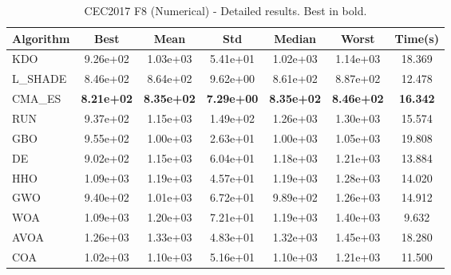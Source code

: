 \begin{table}[H]
\centering\small
\caption{CEC2017 F8 (Numerical) - Detailed results. Best in bold.}
\label{tab:cec2017_F8}
\begin{tabular}{lcccccc}
\toprule
\textbf{Algorithm} & \textbf{Best} & \textbf{Mean} & \textbf{Std} & \textbf{Median} & \textbf{Worst} & \textbf{Time(s)} \\
\midrule
KDO & 9.26e+02 & 1.03e+03 & 5.41e+01 & 1.02e+03 & 1.14e+03 & 18.369 \\
L_SHADE & 8.46e+02 & 8.64e+02 & 9.62e+00 & 8.61e+02 & 8.87e+02 & 12.478 \\
CMA_ES & \textbf{8.21e+02} & \textbf{8.35e+02} & \textbf{7.29e+00} & \textbf{8.35e+02} & \textbf{8.46e+02} & \textbf{16.342} \\
RUN & 9.37e+02 & 1.15e+03 & 1.49e+02 & 1.26e+03 & 1.30e+03 & 15.574 \\
GBO & 9.55e+02 & 1.00e+03 & 2.63e+01 & 1.00e+03 & 1.05e+03 & 19.808 \\
DE & 9.02e+02 & 1.15e+03 & 6.04e+01 & 1.18e+03 & 1.21e+03 & 13.884 \\
HHO & 1.09e+03 & 1.19e+03 & 4.57e+01 & 1.19e+03 & 1.28e+03 & 14.020 \\
GWO & 9.40e+02 & 1.01e+03 & 6.72e+01 & 9.89e+02 & 1.26e+03 & 14.912 \\
WOA & 1.09e+03 & 1.20e+03 & 7.21e+01 & 1.19e+03 & 1.40e+03 & 9.632 \\
AVOA & 1.26e+03 & 1.33e+03 & 4.83e+01 & 1.32e+03 & 1.45e+03 & 18.280 \\
COA & 1.02e+03 & 1.10e+03 & 5.16e+01 & 1.10e+03 & 1.21e+03 & 11.500 \\
\bottomrule
\end{tabular}
\end{table}
